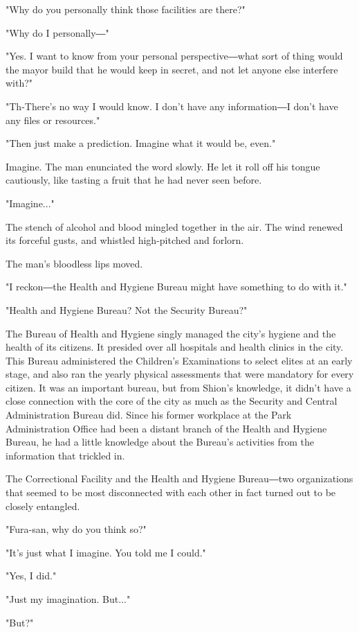 "Why do you personally think those facilities are there?"

"Why do I personally―"

"Yes. I want to know from your personal perspective―what sort of thing
would the mayor build that he would keep in secret, and not let anyone
else interfere with?"

"Th-There's no way I would know. I don't have any information―I don't
have any files or resources."

"Then just make a prediction. Imagine what it would be, even."

Imagine. The man enunciated the word slowly. He let it roll off his
tongue cautiously, like tasting a fruit that he had never seen before.

"Imagine..."

The stench of alcohol and blood mingled together in the air. The wind
renewed its forceful gusts, and whistled high-pitched and forlorn.

The man's bloodless lips moved.

"I reckon―the Health and Hygiene Bureau might have something to do with
it."

"Health and Hygiene Bureau? Not the Security Bureau?"

The Bureau of Health and Hygiene singly managed the city's hygiene and
the health of its citizens. It presided over all hospitals and health
clinics in the city. This Bureau administered the Children's
Examinations to select elites at an early stage, and also ran the yearly
physical assessments that were mandatory for every citizen. It was an
important bureau, but from Shion's knowledge, it didn't have a close
connection with the core of the city as much as the Security and Central
Administration Bureau did. Since his former workplace at the Park
Administration Office had been a distant branch of the Health and
Hygiene Bureau, he had a little knowledge about the Bureau's activities
from the information that trickled in.

The Correctional Facility and the Health and Hygiene Bureau―two
organizations that seemed to be most disconnected with each other in
fact turned out to be closely entangled.

"Fura-san, why do you think so?"

"It's just what I imagine. You told me I could."

"Yes, I did."

"Just my imagination. But..."

"But?"

